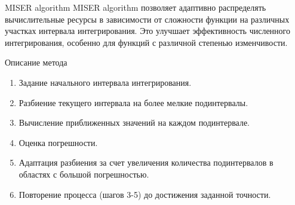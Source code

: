 \documentclass{beamer}
\begin{document}
	\begin{frame}{MISER algorithm}
		MISER algorithm позволяет адаптивно распределять вычислительные ресурсы в зависимости от сложности функции на различных участках интервала интегрирования. Это улучшает эффективность численного интегрирования, особенно для функций с различной степенью изменчивости.

		Описание метода

		\begin{enumerate}
			\item
			Задание начального интервала интегрирования.
			\item 
			Разбиение текущего интервала на более мелкие подинтервалы.
			\item 
			Вычисление приближенных значений на каждом подинтервале.
			\item 
			Оценка погрешности.
			\item 
			Адаптация разбиения за счет увеличения количества подинтервалов в областях с большой погрешностью.
			\item 
			Повторение процесса (шагов 3-5) до достижения заданной точности.
		\end{enumerate}


	\end{frame}
\end{document}
